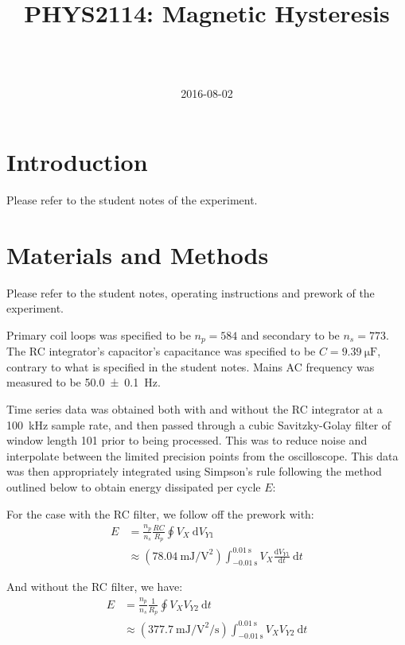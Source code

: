 \documentclass[a4paper]{scrartcl}
\begin{document}
\title{PHYS2114: Magnetic Hysteresis}
\author{ \\ \\ }
\date{2016-08-02}
\maketitle

\section{Introduction}
Please refer to the student notes of the experiment.

\section{Materials and Methods}
Please refer to the student notes, operating instructions and prework of the experiment.

Primary coil loops was specified to be \(n_p = 584\) and secondary to be \(n_s = 773\). The RC integrator's capacitor's capacitance was specified to be \(C = \SI{9.39}{\micro\farad}\), contrary to what is specified in the student notes. Mains AC frequency was measured to be \SI{50.0 \pm 0.1}{\hertz}.

Time series data was obtained both with and without the RC integrator at a \SI{100}{\kilo\hertz} sample rate, and then passed through a cubic Savitzky-Golay filter of window length 101 prior to being processed. This was to reduce noise and interpolate between the limited precision points from the oscilloscope. This data was then appropriately integrated using Simpson's rule following the method outlined below to obtain energy dissipated per cycle \(E\):

For the case with the RC filter, we follow off the prework with:
\begin{align*}
    E &= \frac{n_p}{n_s}\frac{R C}{R_p} \oint V_X \:\mathrm{d}V_{Y1} \\
    &\approx (\SI{78.04}{\milli\joule\per\volt\squared}) \int_{\SI{-0.01}{\second}}^{\SI{0.01}{\second}} V_X \frac{\mathrm{d}V_{Y1}}{\mathrm{d}t} \:\mathrm{d}t
\end{align*}

And without the RC filter, we have:
\begin{align*}
    E &= \frac{n_p}{n_s}\frac{1}{R_p} \oint V_X V_{Y2} \:\mathrm{d}t \\
    &\approx (\SI{377.7}{\milli\joule\per\volt\squared\per\second}) \int_{\SI{-0.01}{\second}}^{\SI{0.01}{\second}} V_X V_{Y2} \:\mathrm{d}t
\end{align*}
\end{document}
